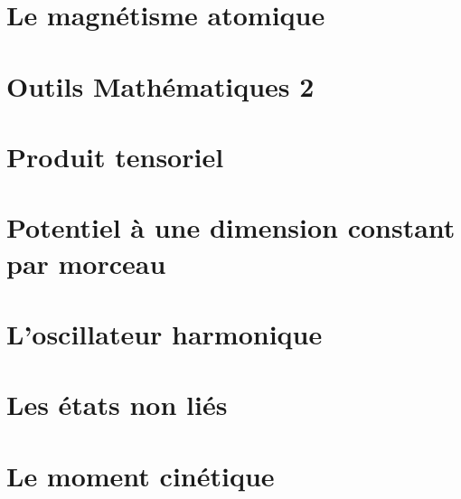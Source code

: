 \documentclass[12pt,a4paper,titlepage]{book}
\begin{document}
\section{Le magnétisme atomique}

\section{Outils Mathématiques 2}

\section{Produit tensoriel}

\section{Potentiel à une dimension constant par morceau}

\section{L'oscillateur harmonique}

\section{Les états non liés}

\section{Le moment cinétique}
\end{document}
